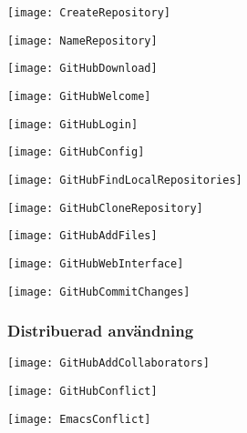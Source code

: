 \documentclass[swedish]{beamer}
\begin{document}
\begin{frame}[fragile]
\texttt{[image: CreateRepository]}  
\end{frame}

\begin{frame}[fragile]
\texttt{[image: NameRepository]}
\end{frame}

\begin{frame}[fragile]
\texttt{[image: GitHubDownload]}

\end{frame}

\begin{frame}[fragile]
\texttt{[image: GitHubWelcome]}
\end{frame}

\begin{frame}[fragile]
\texttt{[image: GitHubLogin]}
\end{frame}

\begin{frame}[fragile]
\texttt{[image: GitHubConfig]}
\end{frame}

\begin{frame}[fragile]
\texttt{[image: GitHubFindLocalRepositories]}
\end{frame}

\begin{frame}
\texttt{[image: GitHubCloneRepository]}
\end{frame}

\begin{frame}[fragile]
\texttt{[image: GitHubAddFiles]}
\end{frame}

\begin{frame}[fragile]
\texttt{[image: GitHubWebInterface]}
\end{frame}

\begin{frame}[fragile]
\texttt{[image: GitHubCommitChanges]}
\end{frame}

\begin{frame}[fragile]
\frametitle{Distribuerad användning}
\texttt{[image: GitHubAddCollaborators]}
\end{frame}


\begin{frame}[fragile]
\texttt{[image: GitHubConflict]}
\end{frame}

\begin{frame}
\texttt{[image: EmacsConflict]}
\end{frame}
\end{document}
